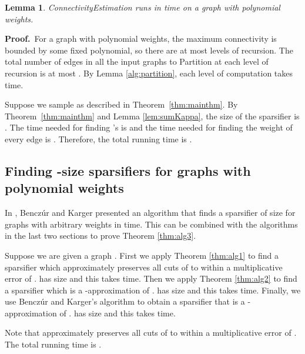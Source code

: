 \documentclass[11pt]{article}
\newcommand{\proofbelow}{8pt}
\numberwithin{equation}{section}
\newtheorem{lemma}[theorem]{Lemma}
\renewenvironment{proof}{\noindent\textbf{Proof.}\,}{\afterproof}
\newcommand{\afterproof}{\hfill  \par \vspace{\proofbelow}}
\newcommand{\Theorem}[1]{Theorem~\ref{thm:#1}}
\begin{document}
\begin{lemma}
ConnectivityEstimation runs in  time on a graph with polynomial weights.
\end{lemma}
\begin{proof}
For a graph with polynomial weights, 
the maximum connectivity is bounded by some fixed polynomial,
so there are at most  levels of recursion.
The total number of edges in all the input graphs to Partition at each level of recursion
is at most .
By Lemma \ref{alg:partition}, each level of computation takes  time. 
\end{proof}

Suppose we sample as described in \Theorem{mainthm}.
By \Theorem{mainthm} and Lemma \ref{lem:sumKappa},
the size of the sparsifier is .
The time needed for finding 's is 
and the time needed for finding the weight of every edge is .
Therefore, the total running time is .


\subsection{Finding -size sparsifiers for graphs with polynomial weights}

In \cite{BK}, Bencz\'ur and Karger presented an algorithm that finds a sparsifier of size 
 for graphs with arbitrary weights in  time. 
This can be combined with the algorithms in the last two sections
to prove Theorem \ref{thm:alg3}.

Suppose we are given a graph .
First we apply Theorem \ref{thm:alg1} to find a sparsifier 
which approximately preserves all cuts of  to within a multiplicative error of .
 has size  and
this takes  time. 
Then we apply Theorem \ref{thm:alg2} to find a sparsifier 
which is a -approximation of .
 has size 
and this takes  time.
Finally, we use Bencz\'ur and Karger's algorithm to 
obtain a sparsifier  that is a -approximation of .
 has size  and
this takes  time. 

Note that  approximately preserves all cuts of  
to within a multiplicative error of .
The total running time is .
\end{document}
